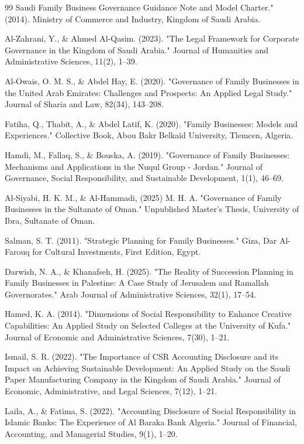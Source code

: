 \documentclass[10pt]{NSP1}
\begin{document}
\begin{thebibliography}{99}
Saudi Family Business Governance Guidance Note and Model Charter." (2014). Ministry of Commerce and Industry, Kingdom of Saudi Arabia.

Al-Zahrani, Y., \& Ahmed Al-Qasim. (2023). "The Legal Framework for Corporate Governance in the Kingdom of Saudi Arabia." Journal of Humanities and Administrative Sciences, 11(2), 1–39.

Al-Owais, O. M. S., \& Abdel Hay, E. (2020). "Governance of Family Businesses in the United Arab Emirates: Challenges and Prospects: An Applied Legal Study." Journal of Sharia and Law, 82(34), 143–208.

Fatiha, Q., Thabit, A., \& Abdel Latif, K. (2020). "Family Businesses: Models and Experiences." Collective Book, Abou Bakr Belkaïd University, Tlemcen, Algeria.

Hamdi, M., Fallaq, S., \& Bouska, A. (2019). "Governance of Family Businesses: Mechanisms and Applications in the Nuqul Group - Jordan." Journal of Governance, Social Responsibility, and Sustainable Development, 1(1), 46–69.

Al-Siyabi, H. K. M., \& Al-Hammadi, (2025) M. H. A. "Governance of Family Businesses in the Sultanate of Oman." Unpublished Master's Thesis, University of Ibra, Sultanate of Oman.

Salman, S. T. (2011). "Strategic Planning for Family Businesses." Giza, Dar Al-Farouq for Cultural Investments, First Edition, Egypt.

Darwish, N. A., \& Khanafseh, H. (2025). "The Reality of Succession Planning in Family Businesses in Palestine: A Case Study of Jerusalem and Ramallah Governorates." Arab Journal of Administrative Sciences, 32(1), 17–54.

Hamed, K. A. (2014). "Dimensions of Social Responsibility to Enhance Creative Capabilities: An Applied Study on Selected Colleges at the University of Kufa." Journal of Economic and Administrative Sciences, 7(30), 1–21.

Ismail, S. R. (2022). "The Importance of CSR Accounting Disclosure and its Impact on Achieving Sustainable Development: An Applied Study on the Saudi Paper Manufacturing Company in the Kingdom of Saudi Arabia." Journal of Economic, Administrative, and Legal Sciences, 7(12), 1–21.

Laila, A., \& Fatima, S. (2022). "Accounting Disclosure of Social Responsibility in Islamic Banks: The Experience of Al Baraka Bank Algeria." Journal of Financial, Accounting, and Managerial Studies, 9(1), 1–20.


\end{thebibliography}
\end{document}
